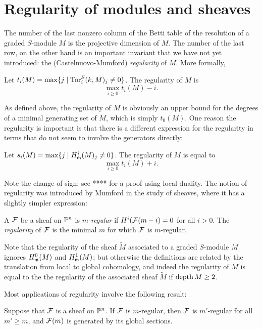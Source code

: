 \section{Regularity of modules and sheaves}
The number of the last nonzero column of the Betti table of the resolution of a graded $S$-module $M$ is the projective dimension of $M$. The number of the last row, on the other hand is an important invariant that we have not
yet introduced: the (Castelnuovo-Mumford) \emph {regularity} of $M$. More formally,
\begin{definition}
Let $t_{i}(M) = \max \{j \mid \operatorname{Tor}^{S}_{i}(k,M)_{j} \neq 0\}$. The regularity of $M$ is
$$
\max_{i \geq 0} t_{i}(M)-i.
$$
\end{definition}

As defined above, the regularity of $M$ is obviously an upper bound for the degrees of a minimal generating
set of $M$, which is simply $t_{0}(M)$. One reason the regularity is important is that there is a different expression for the regularity in terms that do not seem to involve the generators directly:

\begin{theorem}
 Let $s_{i}(M) = \max\{j \mid H^{i}_{\mathfrak m}(M)_{j} \neq 0\}$. The regularity of $M$ is equal to
 $$
\max_{i \geq 0} t_{i}(M)+i.
$$
\end{theorem}

Note the change of sign; see **** for a proof using local duality. The notion of regularity was introduced by Mumford in the study of sheaves, where it has a slightly simpler expression:

\begin{definition}
A ${\mathcal F}$ be a sheaf on ${\mathbb P}^{n}$ is \emph{$m$-regular} if $H^{i}({\mathcal F}(m-i) = 0$ for all $i>0$. The \emph{regularity} of ${\mathcal F}$ is the minimal $m$ for which ${\mathcal F}$ is $m$-regular.
\end{definition}

 Note that the regularity
of the sheaf $\tilde M$ associated to a graded $S$-module $M$ ignores $H^{0}_{\mathfrak m}(M)$ and 
$H^{1}_{\mathfrak m}(M)$; but otherwise the definitions are related by the translation from local to global
cohomology, and indeed the regularity of
$M$ is equal to the the regularity of the associated sheaf $\tilde M$ if $\operatorname{depth} M \geq 2$. 

Most applications of
regularity involve the following result:
\begin{theorem}

Suppose that ${\mathcal F}$ is a sheaf on ${\mathbb P}^{n}$. If ${\mathcal F}$ is $m$-regular, then ${\mathcal F}$ is $m'$-regular for all $m'\geq m$, and ${\mathcal F}(m)$ is generated by its global sections.
\end{theorem}

